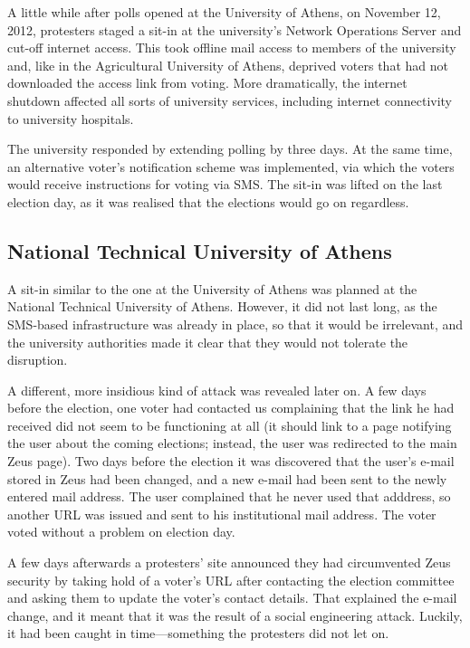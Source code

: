 \documentclass[letterpaper,10pt]{article}
\begin{document}
A little while after polls opened at the University of Athens, on
November 12, 2012, protesters staged a sit-in at the university's
Network Operations Server and cut-off internet access. This took
offline mail access to members of the university and, like in the
Agricultural University of Athens, deprived voters that had not
downloaded the access link from voting. More dramatically, the
internet shutdown affected all sorts of university services, including
internet connectivity to university hospitals.

The university responded by extending polling by three days. At the
same time, an alternative voter's notification scheme was implemented,
via which the voters would receive instructions for voting via SMS.
The sit-in was lifted on the last election day, as it was realised
that the elections would go on regardless.

\subsection{National Technical University of Athens}

A sit-in similar to the one at the University of Athens was planned at
the National Technical University of Athens. However, it did not last
long, as the SMS-based infrastructure was already in place, so that it
would be irrelevant, and the university authorities made it clear that
they would not tolerate the disruption.

A different, more insidious kind of attack was revealed later on. A
few days before the election, one voter had contacted us complaining
that the link he had received did not seem to be functioning at all
(it should link to a page notifying the user about the coming
elections; instead, the user was redirected to the main Zeus page).
Two days before the election it was discovered that the user's e-mail
stored in Zeus had been changed, and a new e-mail had been sent to the
newly entered mail address. The user complained that he never used
that adddress, so another URL was issued and sent to his institutional
mail address. The voter voted without a problem on election day.

A few days afterwards a protesters' site announced they had
circumvented Zeus security by taking hold of a voter's URL after
contacting the election committee and asking them to update the
voter's contact details. That explained the e-mail change, and it
meant that it was the result of a social engineering attack. Luckily,
it had been caught in time---something the protesters did not let on.
\end{document}
